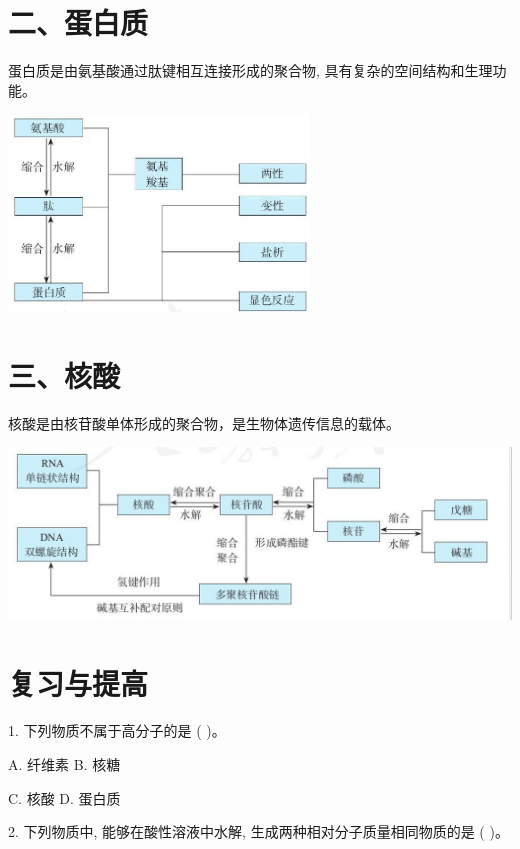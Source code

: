 \documentclass[10pt]{article}
\begin{document}
\section*{二、蛋白质}

蛋白质是由氨基酸通过肽键相互连接形成的聚合物, 具有复杂的空间结构和生理功能。

\begin{center}
\includegraphics[max width=0.6\textwidth]{images/0190efc5-b58a-7c43-bfb0-e0a030df9cfd_132_294561.jpg}
\end{center}

\section*{三、核酸}

核酸是由核苷酸单体形成的聚合物，是生物体遗传信息的载体。

\begin{center}
\includegraphics[max width=1.0\textwidth]{images/0190efc5-b58a-7c43-bfb0-e0a030df9cfd_132_187523.jpg}
\end{center}

\section*{复习与提高}

1. 下列物质不属于高分子的是 ( )。

A. 纤维素 B. 核糖

C. 核酸 D. 蛋白质

2. 下列物质中, 能够在酸性溶液中水解, 生成两种相对分子质量相同物质的是 ( )。
\end{document}
